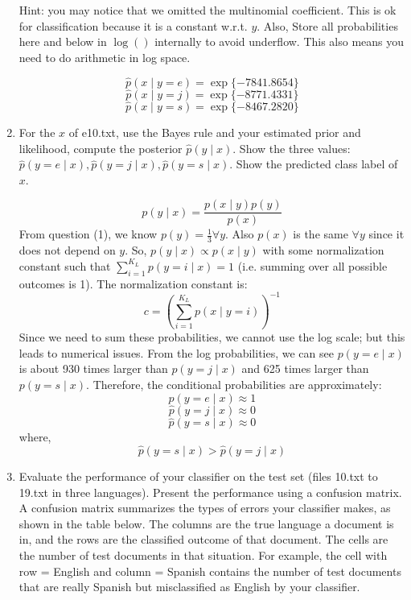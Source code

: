 \documentclass[a4paper]{article}
\theoremstyle{definition}
\newenvironment{soln}{
    \leavevmode\color{blue}\ignorespaces
}{}
\begin{document}
\begin{enumerate}
Hint: you may notice that we omitted the multinomial coefficient.  This is ok for classification because it is a constant w.r.t. $y$. Also, Store all probabilities here and below in $\log()$ internally to avoid underflow. This also means you need to do arithmetic in log space. 

\begin{soln}
    $$
    \hat p(x \mid y=e) = \exp\{-7841.8654\}
    $$
    $$
    \hat p(x \mid y=j) = \exp\{-8771.4331\}
    $$
    $$
    \hat p(x \mid y=s) = \exp\{-8467.2820\}
    $$
\end{soln}

\item
For the $x$ of e10.txt, use the Bayes rule and your estimated prior and likelihood, compute the posterior $\hat p(y \mid x)$.
Show the three values: $\hat p(y=e \mid x), \hat p(y=j \mid x), \hat p(y=s \mid x)$.
Show the predicted class label of $x$.

\begin{soln}
    $$
    p(y \mid x) = \frac{p(x \mid y) p(y)}{p(x)}
    $$
    From question (1), we know $p(y) = \frac{1}{3} \forall y$.
    Also $p(x)$ is the same $\forall y$ since it does not depend on $y$. 
    So, $p(y \mid x) \propto p(x \mid y)$ with some normalization constant such that $\sum_{i = 1}^{K_L} p(y = i \mid x) = 1$ (i.e. summing over all possible outcomes is 1).
    The normalization constant is:
    $$
    c = \left( \sum_{i=1}^{K_L} p(x \mid y = i) \right)^{-1}
    $$
    Since we need to sum these probabilities, we cannot use the log scale; but this leads to numerical issues.
    From the log probabilities, we can see $p(y = e \mid x)$ is about 930 times larger than $p(y = j \mid x)$ and 625 times larger than $p(y = s \mid x)$.
    Therefore, the conditional probabilities are approximately:
    $$
    \hat p(y=e \mid x) \approx 1
    $$
    $$
    \hat p(y=j \mid x) \approx 0
    $$
    $$
    \hat p(y=s \mid x) \approx 0
    $$ 
    where,
    $$
    \hat p(y=s \mid x) > \hat p(y=j \mid x)
    $$
\end{soln}

\item
Evaluate the performance of your classifier on the test set (files 10.txt to 19.txt in three languages).
Present the performance using a confusion matrix. A confusion matrix summarizes the types of errors your classifier makes, as shown in the table below.   The columns are the true language a document is in, and the rows are the classified outcome of that document.  The cells are the number of test documents in that situation.  For example, the cell with row = English and column = Spanish contains the number of test documents that are really Spanish but misclassified as English by your classifier.


\end{enumerate}
\end{document}

